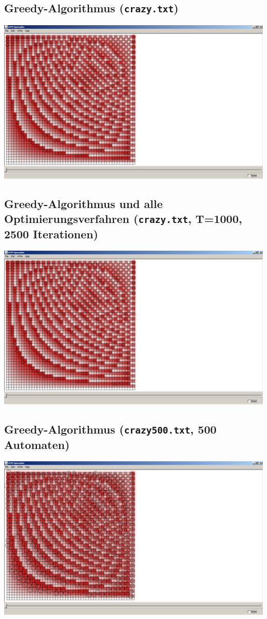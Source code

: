 \documentclass[12pt,a4paper]{article}
\begin{document}
\subsection{Greedy-Algorithmus (\texttt{crazy.txt})}
\includegraphics[width=1.0\textwidth]{crazy.pdf}

\subsection{Greedy-Algorithmus und alle Optimierungsverfahren (\texttt{crazy.txt}, T=1000, 2500 Iterationen)}
\includegraphics[width=1.0\textwidth]{crazy_alles.pdf}

\subsection{Greedy-Algorithmus (\texttt{crazy500.txt}, 500 Automaten)}
\includegraphics[width=1.0\textwidth]{crazy500.pdf}
\end{document}

